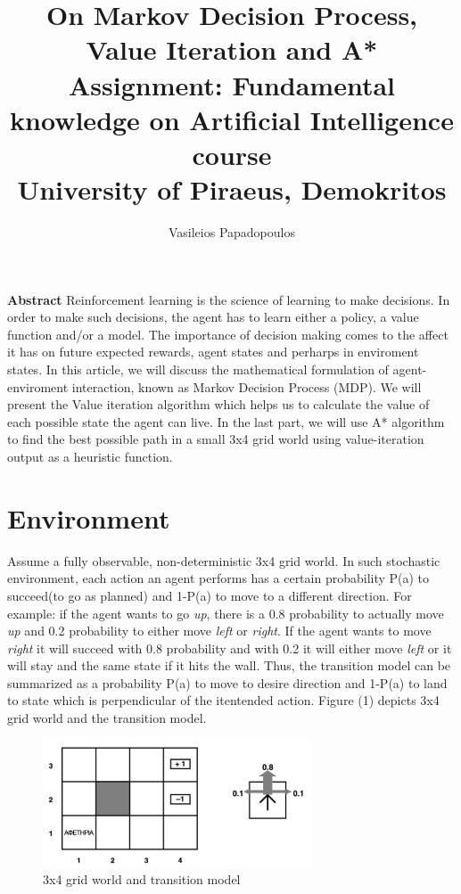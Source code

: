 \documentclass[10pt,a4paper,twocolumn]{article}
\title{%
		On Markov Decision Process, Value Iteration and A* \\
	\large Assignment: Fundamental knowledge on Artificial Intelligence course\\
			University of Piraeus, Demokritos}
\author{Vasileios Papadopoulos}
\begin{document}
	\maketitle
	
	\textbf{Abstract}
	Reinforcement learning is the science of learning to make decisions. In order to make such decisions, the agent has to learn either a policy,	a value function and/or a model. The importance of decision making comes to the affect it has on future expected rewards, agent states and perharps in enviroment states. In this article, we will discuss the mathematical formulation of agent-enviroment interaction, known as Markov Decision Process (MDP). We will present the Value iteration algorithm which helps us to calculate the value of each possible state the agent can live. In the last part, we will use A* algorithm to find the best possible path in a small 3x4 grid world using value-iteration output as a heuristic function.
	
	
	\section{Environment}
	
	Assume a fully observable, non-deterministic 3x4 grid world. In such stochastic environment, 
	each action an agent performs has a certain probability P(a) to succeed(to go as planned) and 1-P(a) to move to a different direction. 
	For example: if the agent wants to go \textit{up}, there is a 0.8 probability to actually move \textit{up} and 0.2 probability to either move \textit{left} or \textit{right}. If the agent wants to move \textit{right} it will succeed with 0.8 probability and with 0.2 it will either move \textit{left} or it will stay and the same state if it hits the wall. Thus, the transition model can be summarized as a probability P(a) to move to desire direction and 1-P(a) to land to state which is perpendicular of the itentended action. Figure (1) depicts 3x4 grid world and the transition model.
\begin{figure}[ht!]
	\centering
	\includegraphics[width=80mm]{grid_world}
	\caption{3x4 grid world and transition model \label{overflow}}
\end{figure}
	
\end{document}
